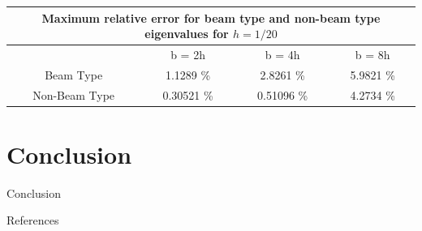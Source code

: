 \documentclass[8pt]{beamer}
\begin{document}
        \begin{frame}
            \begin{table}[htbp]
                \centering
                \begin{tabular}{|c|ccc|}
                    \hline
                    \multicolumn{4}{|c|}{Maximum relative error for beam type and non-beam type eigenvalues for $h = 1/20$} \\
                    \hline
                    \hline
                    & {b = 2h} & {b = 4h} & {b = 8h} \\
                    \hline
                    Beam Type & 1.1289 \% & 2.8261 \% & 5.9821 \% \\
                    Non-Beam Type & 0.30521 \% & 0.51096 \% & 4.2734 \% \\
                    \hline
                \end{tabular}%
                \label{tab:b>h-split_20}%
            \end{table}%
        \end{frame}

\section{Conclusion}
    \begin{frame}{Conclusion}
    \end{frame}

    \begin{frame}{References}
        \printbibliography[heading=bibintoc, title={References}]
    \end{frame}
\end{document}
